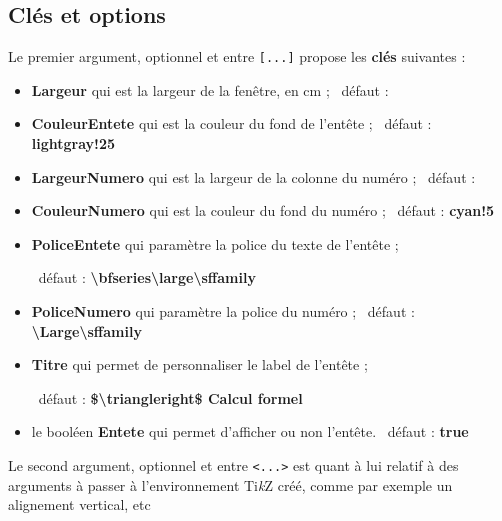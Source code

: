 \documentclass[french,a4paper,11pt]{article}
\providecommand\tikzlogo{Ti\textit{k}Z}
\let\TikZ\tikzlogo
\newcommand\Cle[1]{{\bfseries\sffamily\textlangle #1\textrangle}}
\begin{document}
\begin{PresentationCode}{}
\begin{CalculFormelGeogebra}
\end{CalculFormelGeogebra}
\end{PresentationCode}

\subsection{Clés et options}

\begin{tipblock}
Le premier argument, optionnel et entre \texttt{[...]} propose les \Cle{clés} suivantes :

\begin{itemize}
	\item \Cle{Largeur} qui est la largeur de la fenêtre, en cm ; \hfill~défaut : \Cle{10}
	\item \Cle{CouleurEntete} qui est la couleur du fond de l'entête ; \hfill~défaut : \Cle{lightgray!25}
	\item \Cle{LargeurNumero} qui est la largeur de la colonne du numéro ; \hfill~défaut : \Cle{1}
	\item \Cle{CouleurNumero} qui est la couleur du fond du numéro ; \hfill~défaut : \Cle{cyan!5}
	\item \Cle{PoliceEntete} qui paramètre la police du texte de l'entête  ;
	
	\hfill~défaut : \Cle{\textbackslash bfseries\textbackslash large\textbackslash sffamily}
	\item \Cle{PoliceNumero} qui paramètre la police du numéro  ; \hfill~défaut : \Cle{\textbackslash Large\textbackslash sffamily}
	\item \Cle{Titre} qui permet de personnaliser le label de l'entête ;
	
	\hfill~défaut : \Cle{\$\textbackslash triangleright\$ Calcul formel}
	\item le booléen \Cle{Entete} qui permet d'afficher ou non l'entête. \hfill~défaut : \Cle{true}
\end{itemize}
\vspace*{-\baselineskip}\leavevmode
\end{tipblock}

\begin{tipblock}
Le second argument, optionnel et entre \texttt{<...>} est quant à lui relatif à des arguments à passer à l'environnement \TikZ{} créé, comme par exemple un alignement vertical, etc
\end{tipblock}
\end{document}
